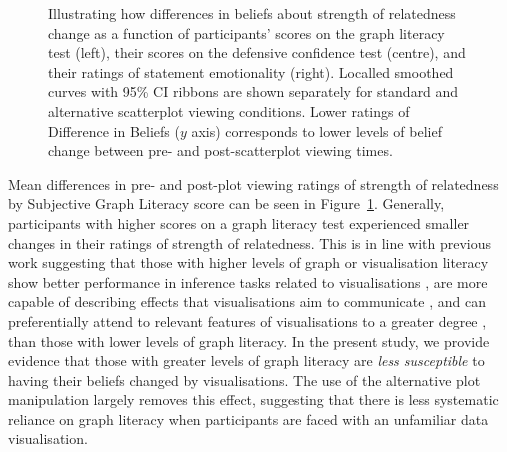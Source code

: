 \documentclass[sigconf]{acmart}
\begin{document}
\begin{figure}


\caption{\label{fig-add-analyses-plots}Illustrating how differences in
beliefs about strength of relatedness change as a function of
participants' scores on the graph literacy test (left), their scores on
the defensive confidence test (centre), and their ratings of statement
emotionality (right). Localled smoothed curves with 95\% CI ribbons are
shown separately for standard and alternative scatterplot viewing
conditions. Lower ratings of Difference in Beliefs (\(y\) axis)
corresponds to lower levels of belief change between pre- and
post-scatterplot viewing times.}

\end{figure}%

Mean differences in pre- and post-plot viewing ratings of strength of
relatedness by Subjective Graph Literacy score can be seen in
Figure~\ref{fig-add-analyses-plots}. Generally, participants with higher
scores on a graph literacy test experienced smaller changes in their
ratings of strength of relatedness. This is in line with previous work
suggesting that those with higher levels of graph or visualisation
literacy show better performance in inference tasks related to
visualisations \citep{canham_2010}, are more capable of describing
effects that visualisations aim to communicate \citep{shah_2011}, and
can preferentially attend to relevant features of visualisations to a
greater degree \citep{okan_2016}, than those with lower levels of graph
literacy. In the present study, we provide evidence that those with
greater levels of graph literacy are \emph{less susceptible} to having
their beliefs changed by visualisations. The use of the alternative plot
manipulation largely removes this effect, suggesting that there is less
systematic reliance on graph literacy when participants are faced with
an unfamiliar data visualisation.
\end{document}
